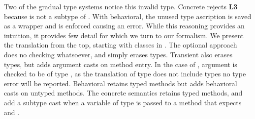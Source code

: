 \documentclass[USenglish]{tex/lipics-v2016}
\begin{document}
Two of the gradual type systems notice this invalid type. Concrete rejects
{\bf L3} because \E is not a subtype of \C.  With behavioral, the unused
type ascription is saved as a wrapper and is enforced causing an error.
While this reasoning provides an intuition, it provides few detail for which
we turn to our formalism.  We present the translation from the top, starting
with classes in .  The optional approach does no
checking whatsoever, and simply erases types. Transient also erases types,
but adds argument casts on method entry. In the case of \m, argument \x is
checked to be of type \E, as the translation of type \E does not include
types no type error will be reported.  Behavioral retains typed methods but
adds behavioral casts on untyped methods.  The concrete semantics retains
typed methods, and add a subtype cast when a variable of type \any is passed
to a method that expects and \E.
\end{document}
